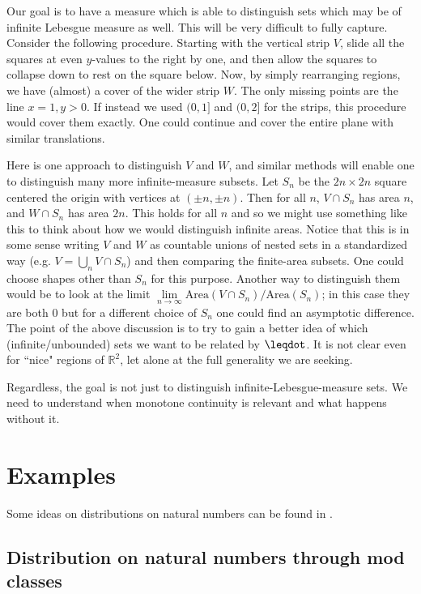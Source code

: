 \documentclass[10pt, onecolumn, nofootinbib]{revtex4-2}
\begin{document}
Our goal is to have a measure which is able to distinguish sets which may be of infinite Lebesgue measure as well. This will be very difficult to fully capture. Consider the following procedure. Starting with the vertical strip $V$, slide all the squares at even $y$-values to the right by one, and then allow the squares to collapse down to rest on the square below. Now, by simply rearranging regions, we have (almost) a cover of the wider strip $W$. The only missing points are the line $x=1, y>0$. If instead we used $(0,1]$ and $(0,2]$ for the strips, this procedure would cover them exactly. One could continue and cover the entire plane with similar translations. 

Here is one approach to distinguish $V$ and $W$, and similar methods will enable one to distinguish many more infinite-measure subsets. Let $S_n$ be the $2n\times 2n$ square centered the origin with vertices at $(\pm n, \pm n)$. Then for all $n$, $V\cap S_n$ has area $n$, and $W\cap S_n$ has area $2n$. This holds for all $n$ and so we might use something like this to think about how we would distinguish infinite areas. Notice that this is in some sense writing $V$ and $W$ as countable unions of nested sets in a standardized way (e.g. $V = \bigcup\limits_n V\cap S_n$) and then comparing the finite-area subsets. One could choose shapes other than $S_n$ for this purpose. Another way to distinguish them would be to look at the limit $\lim\limits_{n\to\infty}\text{Area}(V\cap S_n)/\text{Area}(S_n)$; in this case they are both 0 but for a different choice of $S_n$ one could find an asymptotic difference. 
The point of the above discussion is to try to gain a better idea of which (infinite/unbounded) sets we want to be related by $\finer$. It is not clear even for ``nice" regions of $\mathbb{R}^2$, let alone at the full generality we are seeking. 

Regardless, the goal is not just to distinguish infinite-Lebesgue-measure sets. We need to understand when monotone continuity is relevant and what happens without it. 

\section{Examples}

Some ideas on distributions on natural numbers can be found in \cite{Schirokauer2007}.

\subsection{Distribution on natural numbers through mod classes}
\end{document}
